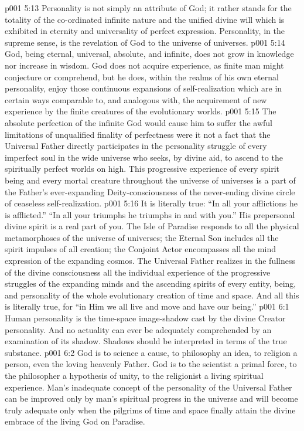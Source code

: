 \vs p001 5:13 \pc Personality is not simply an attribute of God; it rather stands for the totality of the co\hyp{}ordinated infinite nature and the unified divine will which is exhibited in eternity and universality of perfect expression. Personality, in the supreme sense, is the revelation of God to the universe of universes.
\vs p001 5:14 \pc God, being eternal, universal, absolute, and infinite, does not grow in knowledge nor increase in wisdom. God does not acquire experience, as finite man might conjecture or comprehend, but he does, within the realms of his own eternal personality, enjoy those continuous expansions of self\hyp{}realization which are in certain ways comparable to, and analogous with, the acquirement of new experience by the finite creatures of the evolutionary worlds.
\vs p001 5:15 The absolute perfection of the infinite God would cause him to suffer the awful limitations of unqualified finality of perfectness were it not a fact that the Universal Father directly participates in the personality struggle of every imperfect soul in the wide universe who seeks, by divine aid, to ascend to the spiritually perfect worlds on high. This progressive experience of every spirit being and every mortal creature throughout the universe of universes is a part of the Father’s ever\hyp{}expanding Deity\hyp{}consciousness of the never\hyp{}ending divine circle of ceaseless self\hyp{}realization.
\vs p001 5:16 It is literally true: “In all your afflictions he is afflicted.” “In all your triumphs he triumphs in and with you.” His prepersonal divine spirit is a real part of you. The Isle of Paradise responds to all the physical metamorphoses of the universe of universes; the Eternal Son includes all the spirit impulses of all creation; the Conjoint Actor encompasses all the mind expression of the expanding cosmos. The Universal Father realizes in the fullness of the divine consciousness all the individual experience of the progressive struggles of the expanding minds and the ascending spirits of every entity, being, and personality of the whole evolutionary creation of time and space. And all this is literally true, for “in Him we all live and move and have our being.”
\vs p001 6:1 Human personality is the time\hyp{}space image\hyp{}shadow cast by the divine Creator personality. And no actuality can ever be adequately comprehended by an examination of its shadow. Shadows should be interpreted in terms of the true substance.
\vs p001 6:2 \pc God is to science a cause, to philosophy an idea, to religion a person, even the loving heavenly Father. God is to the scientist a primal force, to the philosopher a hypothesis of unity, to the religionist a living spiritual experience. Man’s inadequate concept of the personality of the Universal Father can be improved only by man’s spiritual progress in the universe and will become truly adequate only when the pilgrims of time and space finally attain the divine embrace of the living God on Paradise.
